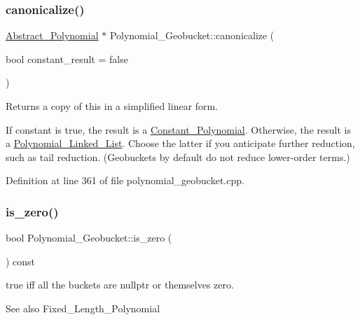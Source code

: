 \subsubsection{\texorpdfstring{canonicalize()}{canonicalize()}}
{\footnotesize\ttfamily \hyperlink{class_abstract___polynomial}{Abstract\+\_\+\+Polynomial} $\ast$ Polynomial\+\_\+\+Geobucket\+::canonicalize (\begin{DoxyParamCaption}\item[{bool}]{constant\+\_\+result = {\ttfamily false} }\end{DoxyParamCaption})\hspace{0.3cm}{\ttfamily [virtual]}}



Returns a copy of {\ttfamily this} in a simplified linear form. 

If {\ttfamily constant} is {\ttfamily true}, the result is a {\ttfamily \hyperlink{class_constant___polynomial}{Constant\+\_\+\+Polynomial}}. Otherwise, the result is a {\ttfamily \hyperlink{class_polynomial___linked___list}{Polynomial\+\_\+\+Linked\+\_\+\+List}}. Choose the latter if you anticipate further reduction, such as tail reduction. (Geobuckets by default do not reduce lower-\/order terms.) 

Definition at line 361 of file polynomial\+\_\+geobucket.\+cpp.

\mbox{\label{class_polynomial___geobucket_a971ed46f9d5d738671f2fb832c7bb52b}} 
\subsubsection{\texorpdfstring{is\+\_\+zero()}{is\_zero()}}
{\footnotesize\ttfamily bool Polynomial\+\_\+\+Geobucket\+::is\+\_\+zero (\begin{DoxyParamCaption}{ }\end{DoxyParamCaption}) const\hspace{0.3cm}{\ttfamily [virtual]}}



{\ttfamily true} iff all the buckets are {\ttfamily nullptr} or themselves zero. 

\begin{DoxySeeAlso}{See also}
Fixed\+\_\+\+Length\+\_\+\+Polynomial 
\end{DoxySeeAlso}


